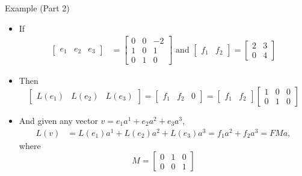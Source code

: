 \documentclass[usenames,dvipsnames,10pt]{beamer}
\begin{document}
\begin{frame}
  {Example (Part 2)}

  \begin{itemize}
  \item If
    \begin{align*}
      \begin{bmatrix} e_1 & e_2 & e_3 \end{bmatrix}
      &= \left[\begin{array}{c|c|c} 0 & 0 & -2 \\ 1 & 0 & 1 \\ 0 & 1 & 0 \end{array}\right]
        \text{ and }
        \begin{bmatrix} f_1 & f_2 \end{bmatrix}
        = \left[\begin{array}{c|c} 2 & 3 \\ 0 & 4 \end{array}\right]
    \end{align*}
  \item Then
    \[
      \begin{bmatrix} L(e_1) & L(e_2) & L(e_3) \end{bmatrix}
      = \begin{bmatrix} f_1 & f_2 & 0 \end{bmatrix} = \begin{bmatrix} f_1 & f_2 \end{bmatrix}
      \begin{bmatrix} 1 & 0 & 0 \\ 0 & 1 & 0 \end{bmatrix}
    \]
  \item And given any vector $v = e_1a^1 + e_2a^2 + e_3a^3$,
    \begin{align*}
      L(v) &= L(e_1)a^1 + L(e_2)a^2 + L(e_3)a^3 = f_1a^2 + f_2a^3 = FMa,
    \end{align*}
    where
    \[
      M = \begin{bmatrix} 0 & 1 & 0 \\ 0 & 0 & 1 \end{bmatrix}
    \]
  \end{itemize}
\end{frame}
\end{document}
